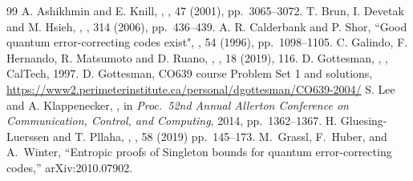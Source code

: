 \documentclass{article}
\theoremstyle{remark}
\theoremstyle{definition}
\numberwithin{equation}{section}
\begin{document}
\begin{thebibliography}{99}
 {A. Ashikhmin and E. Knill}, , , 47   (2001), pp.\ 3065--3072.
  {T. Brun, I. Devetak and M. Hsieh}, , , 314  (2006), pp.\ 436--439.
 { A. R. Calderbank and  P. Shor}, {``Good quantum error-correcting codes exist"}, , 54 (1996), pp.\ 1098--1105.
 { C. Galindo, F.  Hernando, R. Matsumoto and D. Ruano}, , , 18 (2019), 116.
 {D. Gottesman}, , , CalTech, 1997.
 {D. Gottesman}, CO639 course Problem Set 1 and solutions, \url{https://www2.perimeterinstitute.ca/personal/dgottesman/CO639-2004/}
 {S. Lee and A. Klappenecker}, , in \emph{Proc.\ 52nd Annual Allerton Conference on Communication, Control, and Computing}, 2014, pp.\ 1362--1367.
 {H. Gluesing-Luerssen and T. Pllaha},  ,  , 58 (2019) pp.\ 145--173.
 M.\ Grassl, F.\ Huber, and A.\ Winter, ``Entropic proofs of Singleton bounds for quantum error-correcting codes,'' arXiv:2010.07902.

\end{thebibliography}
\end{document}
